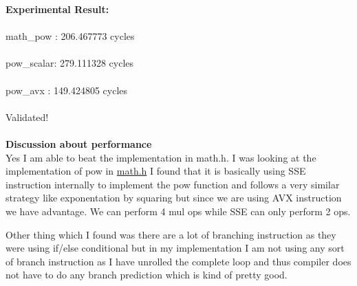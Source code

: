\documentclass[letterpaper, 11pt]{article}
\begin{document}
\textbf{Experimental Result: }\\ \\
math\_pow  : 206.467773 cycles \\ \\
pow\_scalar: 279.111328 cycles\\ \\
pow\_avx   : 149.424805 cycles\\ \\
Validated!
\\ \\ 
\textbf{Discussion about performance}\\
Yes I am able to beat the implementation in math.h. I was looking at the implementation of pow in \href{https://opensource.apple.com/source/Libm/Libm-2026/Source/Intel/expf_logf_powf.c}{math.h} I found that it is basically using SSE instruction internally to implement the pow function and follows a very similar strategy like exponentation by squaring but since we are using AVX instruction we have advantage. We can perform 4 mul ops while SSE can only perform 2 ops. 

Other thing which I found was there are a lot of branching instruction as they were using if/else conditional but in my implementation I am not using any sort of branch instruction as I have unrolled the complete loop and thus compiler does not have to do any branch prediction which is kind of pretty good.
\bigskip

\clearpage

\end{document}
